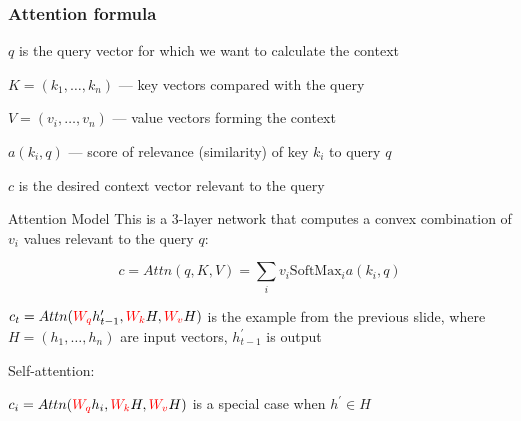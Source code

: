 \documentclass[fullscreen=true, bookmarks=true, hyperref={pdfencoding=unicode}]{beamer}
\begin{document}

\begin{frame}
  \frametitle{Attention formula}

  $q$ is the query vector for which we want to calculate the context

  $K = (k_1, \dots, k_n)$ — key vectors compared with the query

  $V = (v_i, \dots, v_n)$ — value vectors forming the context

  $a(k_i, q)$ — score of relevance (similarity) of key $k_i$ to query $q$

  $c$ is the desired context vector relevant to the query

  \pause
  {\small
  \begin{block}{Attention Model}
   This is a 3-layer network that computes a convex combination of $v_i$ values 
   relevant to the query $q$:

   $$ c = Attn(q,K,V) = \sum\limits_i v_i \text{SoftMax}_i a(k_i, q) $$
 \end{block}
 }

  \pause
  $c_t = Attn({\color{red}W_q} h^\prime_{t-1}, {\color{red}W_k} H, {\color{red}W_v} H)$ is the example from the previous slide, where $H = (h_1, \dots, h_n)$ are input vectors, $h^\prime_{t-1}$ is output

  \pause
  Self-attention:

  $c_i = Attn({\color{red}W_q} h_{i}, {\color{red}W_k} H, {\color{red}W_v} H)$ 
  is a special case when $h^\prime \in H$
\end{frame}

\end{document}
